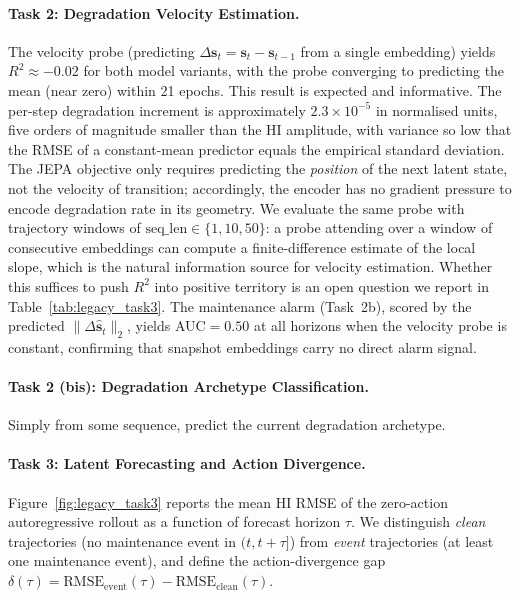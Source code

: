 \paragraph{Task 2: Degradation Velocity Estimation.}
The velocity probe (predicting $\Delta\mathbf{s}_t = \mathbf{s}_t - \mathbf{s}_{t-1}$ from a single embedding) yields $R^2 \approx -0.02$ for both model variants, with the probe converging to predicting the mean (near zero) within 21 epochs. This result is expected and informative.
The per-step degradation increment is approximately $2.3 \times 10^{-5}$ in normalised units, five orders of magnitude smaller than the HI amplitude, with variance so low that the RMSE of a constant-mean predictor equals the empirical standard deviation.
The JEPA objective only requires predicting the \emph{position} of the next latent state, not the velocity of transition; accordingly, the encoder has no gradient pressure to encode degradation rate in its geometry. We evaluate the same probe with trajectory windows of $\mathrm{seq\_len} \in \{1, 10, 50\}$:
a probe attending over a window of consecutive embeddings can compute a finite-difference estimate of the local slope, which is the natural
information source for velocity estimation. Whether this suffices to push $R^2$ into positive territory is an open question we report in Table~\ref{tab:legacy_task3}.
The maintenance alarm (Task~2b), scored by the predicted $\|\Delta\hat{\mathbf{s}}_t\|_2$, yields AUC$=0.50$ at all horizons when the velocity probe is constant, confirming that snapshot embeddings carry no direct alarm signal.

\paragraph{Task 2 (bis): Degradation Archetype Classification.}
Simply from some sequence, predict the current degradation archetype.

\paragraph{Task 3: Latent Forecasting and Action Divergence.}
Figure~\ref{fig:legacy_task3} reports the mean HI RMSE of the zero-action autoregressive rollout as a function of forecast horizon $\tau$. We distinguish \emph{clean} trajectories (no maintenance event in $(t, t{+}\tau]$) from \emph{event} trajectories (at least one maintenance event), and define the action-divergence gap $\delta(\tau) = \mathrm{RMSE}_\mathrm{event}(\tau) - \mathrm{RMSE}_\mathrm{clean}(\tau)$.

